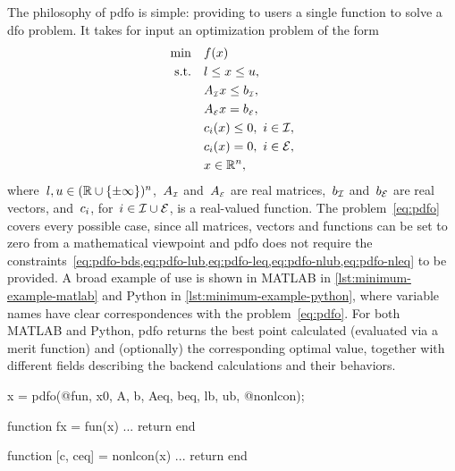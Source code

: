 The philosophy of \gls{pdfo} is simple: providing to users a single function to solve a \gls{dfo} problem.
It takes for input an optimization problem of the form
\begin{subequations}
    \label{eq:pdfo}
    \begin{align}
        \min        & \quad \obj(\iter)\\
        \text{s.t.} & \quad \xl \le \iter \le \xu, \label{eq:pdfo-bds}\\
                    & \quad A_{\scriptscriptstyle\iub} \iter \le b_{\scriptscriptstyle\iub}, \label{eq:pdfo-lub}\\
                    & \quad A_{\scriptscriptstyle\ieq} \iter = b_{\scriptscriptstyle\ieq}, \label{eq:pdfo-leq}\\
                    & \quad \con{i}(\iter) \le 0, ~ i \in \iub, \label{eq:pdfo-nlub}\\
                    & \quad \con{i}(\iter) = 0, ~ i \in \ieq, \label{eq:pdfo-nleq}\\
                    & \quad \iter \in \R^n, \nonumber
    \end{align}
\end{subequations}
where~$l, u \in (\mathbb{R} \cup \{\pm \infty\})^n$,~$A_{\scriptscriptstyle\mathcal{I}}$ and~$A_{\scriptscriptstyle\mathcal{E}}$ are real matrices,~$b _{\mathcal{I}}$ and~$b _{\mathcal{E}}$ are real vectors, and~$c_{i}$, for~$i \in \mathcal{I} \cup \mathcal{E}$, is a real-valued function.
The problem~\cref{eq:pdfo} covers every possible case, since all matrices, vectors and functions can be set to zero from a mathematical viewpoint and \gls{pdfo} does not require the constraints~\cref{eq:pdfo-bds,eq:pdfo-lub,eq:pdfo-leq,eq:pdfo-nlub,eq:pdfo-nleq} to be provided.
A broad example of use is shown in MATLAB in \cref{lst:minimum-example-matlab} and Python in \cref{lst:minimum-example-python}, where variable names have clear correspondences with the problem~\cref{eq:pdfo}.
For both MATLAB and Python, \gls{pdfo} returns the best point calculated (evaluated via a merit function) and (optionally) the corresponding optimal value, together with different fields describing the backend calculations and their behaviors.

\begin{lstmatlab}[%
    caption=An elementary example of \gls{pdfo} in MATLAB,
    label=lst:minimum-example-matlab,
]
    x = pdfo(@fun, x0, A, b, Aeq, beq, lb, ub, @nonlcon);

    function fx = fun(x)
    ...
    return
    end

    function [c, ceq] = nonlcon(x)
    ...
    return
    end
\end{lstmatlab}

